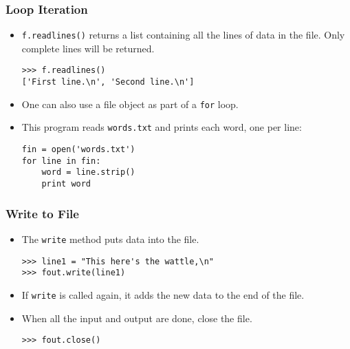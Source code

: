 \documentclass[handout]{beamer}
\newcommand{\beforeverb}{\footnotesize}
\newcommand{\afterverb}{\normalsize}
\begin{document}
\begin{frame}[fragile]
\frametitle{Loop Iteration}
\begin{itemize}
\item {\tt f.readlines()} returns a list containing all the lines of data in the file.  Only complete lines will be returned.
\beforeverb
\begin{verbatim}
>>> f.readlines()
['First line.\n', 'Second line.\n']
\end{verbatim}
\afterverb
\item One can also use a file object as part of a {\tt for} loop.
\item This program reads {\tt words.txt} and prints each word, one
per line:
\beforeverb
\begin{verbatim}
fin = open('words.txt')
for line in fin:
    word = line.strip()
    print word
\end{verbatim}
\afterverb
%
\end{itemize}
\end{frame}
\begin{frame}[fragile]
\frametitle{Write to File}
\begin{itemize}
\item The {\tt write} method puts data into the file.

\beforeverb
\begin{verbatim}
>>> line1 = "This here's the wattle,\n"
>>> fout.write(line1)
\end{verbatim}

\afterverb
\item If {\tt write} is called again, it adds the new data to the end of the file.
\item When all the input and output are done, close the file.

\beforeverb
\begin{verbatim}
>>> fout.close()
\end{verbatim}
\end{itemize}
\end{frame}
\end{document}
